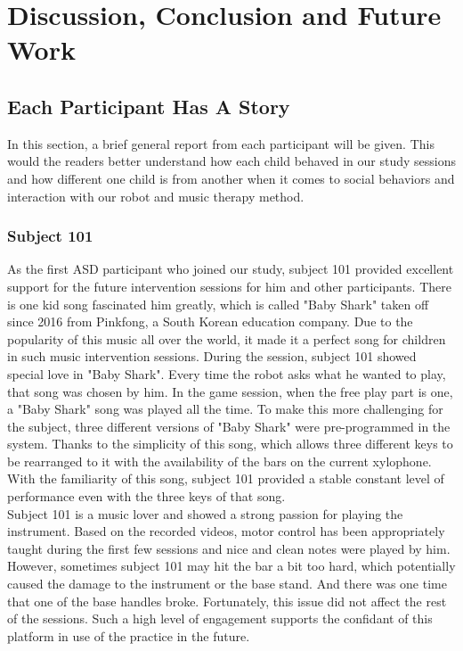 \chapter{Discussion, Conclusion and Future Work}
\section{Each Participant Has A Story}
In this section, a brief general report from each participant will be given. This would the readers better understand how each child behaved in our study sessions and how different one child is from another when it comes to social behaviors and interaction with our robot and music therapy method.\\

\subsection{Subject 101}
As the first ASD participant who joined our study, subject 101 provided excellent support for the future 
intervention sessions for him and other participants. There is one kid song fascinated him greatly, which is called "Baby Shark" taken off since 2016 from Pinkfong, a South Korean education company. 
Due to the popularity of this music all over the world, it made it a perfect song for children in 
such music intervention sessions. During the session, subject 101 showed special love in "Baby Shark".
Every time the robot asks what he wanted to play, that song
was chosen by him. In the game session, when the free play part is one, a "Baby Shark"
song was played all the time. To make this more challenging for the subject, three different versions of
"Baby Shark" were pre-programmed in the system. Thanks to the simplicity of this song, which allows 
three different keys to be rearranged to it with the availability of the bars on the current xylophone. 
With the familiarity of this song, subject 101 provided a stable constant level of performance even
with the three keys of that song. \\

Subject 101 is a music lover and showed a strong passion for playing the instrument. Based on the recorded 
videos, motor control has been appropriately taught during the first few sessions and nice and clean notes were 
played by him. However, sometimes subject 101 may hit the bar a bit too hard, which 
potentially caused the damage to the instrument or the base stand. And there was one time that one of 
the base handles broke. Fortunately, this issue did not affect the rest of the sessions. 
Such a high level of engagement supports the confidant of this platform in use of the practice in the future.\\

